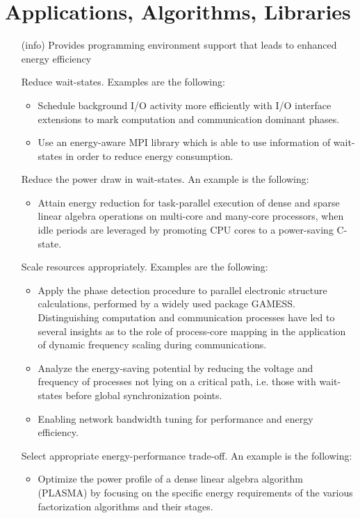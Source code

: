\section{Applications, Algorithms, Libraries}
\begin{itemize}
\item[(info)]
Provides programming environment support that leads to enhanced energy efficiency 

Reduce wait-states. Examples are the following:

\begin{itemize}
\item
Schedule background I/O activity more efficiently with I/O interface extensions to mark computation and communication dominant phases. 
\item
Use an energy-aware MPI library which is able to use information of wait-states in order to reduce energy consumption.
\end{itemize}

Reduce the power draw in wait-states. An example is the following:

\begin{itemize}
\item
Attain energy reduction for task-parallel execution of dense and sparse linear algebra operations on multi-core and many-core processors, when idle periods are leveraged by promoting CPU cores to a power-saving C-state.
\end{itemize}

Scale resources appropriately. Examples are the following:
\begin{itemize}
\item
Apply the phase detection procedure to parallel electronic structure calculations, performed by a widely used package GAMESS. Distinguishing computation and communication processes have led to several insights as to the role of process-core mapping in the application of dynamic frequency scaling during communications.
\item
Analyze the energy-saving potential by reducing the voltage and frequency of processes not lying on a critical path, i.e. those with wait-states before global synchronization points.
\item
Enabling network bandwidth tuning for performance and energy efficiency.
\end{itemize}

Select appropriate energy-performance trade-off. An example is the following:
\begin{itemize}
\item
Optimize the power profile of a dense linear algebra algorithm (PLASMA) by focusing on the specific energy requirements of the various factorization algorithms and their stages.
\end{itemize}


\end{itemize}
